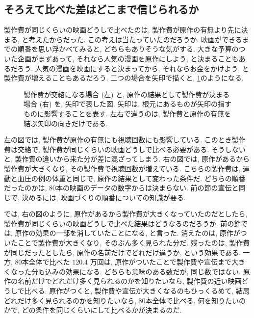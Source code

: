   \subsection{そろえて比べた差はどこまで信じられるか}

    製作費が同じくらいの映画どうしで比べたのは, 製作費が原作の有無より先に決まる, と考えたからだった.
    この考えは当たっていたのだろうか.
    映画ができるまでの順番を思い浮かべてみると, どちらもありそうな気がする.
    大きな予算のついた企画がまずあって, それなら人気の漫画を原作にしよう, と決まることもあるだろう.
    人気の漫画を映画にすると決まってから, それならお金をかけよう, と製作費が増えることもあるだろう.
    二つの場合を矢印で描くと, \cref{fig:ch06-paths}のようになる.

    \begin{figure}[htbp]
      \centering
      
      \caption{製作費が交絡になる場合 (左) と, 原作の結果として製作費が決まる場合 (右) を, 矢印で表した図. 矢印は, 根元にあるものが矢印の指すものに影響することを表す. 左右で違うのは, 製作費と原作の有無を結ぶ矢印の向きだけである.}
      \label{fig:ch06-paths}
    \end{figure}

    左の図では, 製作費が原作の有無にも視聴回数にも影響している.
    このとき製作費は交絡で, 製作費が同じくらいの映画どうしで比べる必要がある.
    そうしないと, 製作費の違いから来た分が差に混ざってしまう.
    右の図では, 原作があるから製作費が大きくなり, その製作費で視聴回数が増えている.
    こちらの製作費は, 運動と血圧の例の体重と同じで, 原作の結果として変わった条件だ.
    どちらの順番だったのかは, 80本の映画のデータの数字からは決まらない.
    前の節の宣伝と同じで, 決めるには, 映画づくりの順番についての知識が要る.

    では, 右の図のように, 原作があるから製作費が大きくなっていたのだとしたら, 製作費が同じくらいの映画どうしで比べた結果はどうなるのだろうか.
    前の節では, 原作の効果の一部を消していたことになる, と言った.
    消えたのは, 原作がついたことで製作費が大きくなり, そのぶん多く見られた分だ.
    残ったのは, 製作費が同じだったとしたら, 原作の名前だけでどれだけ違うか, という効果である.
    一方, 80本全体で比べた $120.4$ 万回は, 原作がついたことで製作費や宣伝まで大きくなった分も込みの効果になる.
    どちらも意味のある数だが, 同じ数ではない.
    原作の名前だけでどれだけ多く見られるのかを知りたいなら, 製作費の近い映画どうしで比べる.
    原作がつくと, 製作費や宣伝が大きくなるのもひっくるめて, 結局どれだけ多く見られるのかを知りたいなら, 80本全体で比べる.
    何を知りたいのかで, どの条件を同じくらいにして比べるかが決まるのだ.

